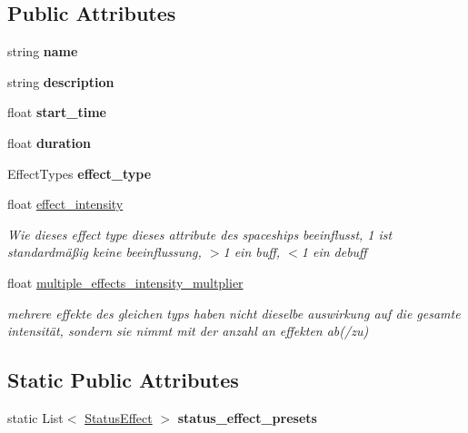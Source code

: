 \subsection*{Public Attributes}
\begin{DoxyCompactItemize}
\item 
\mbox{\label{class_status_effect_a696f2821e6d224c658e8b87d1ce7e796}} 
string {\bfseries name}
\item 
\mbox{\label{class_status_effect_a74029b6847e6b0e538b5e7fc6a762a6c}} 
string {\bfseries description}
\item 
\mbox{\label{class_status_effect_abf37d960e019f77df374e08751044612}} 
float {\bfseries start\+\_\+time}
\item 
\mbox{\label{class_status_effect_a36da090a484cfbcc4ce329f426f5c5a1}} 
float {\bfseries duration}
\item 
\mbox{\label{class_status_effect_a61d875b09e0223962b6ef475f0f540aa}} 
Effect\+Types {\bfseries effect\+\_\+type}
\item 
float \hyperlink{class_status_effect_a8440863026d4e9275ab2c701ddef7938}{effect\+\_\+intensity}
\begin{DoxyCompactList}\small\item\em Wie dieses effect type dieses attribute des spaceships beeinflusst, 1 ist standardmäßig keine beeinflussung, $>$1 ein buff, $<$1 ein debuff \end{DoxyCompactList}\item 
float \hyperlink{class_status_effect_a3504e8fd0ecb620a2678f5cce8660d44}{multiple\+\_\+effects\+\_\+intensity\+\_\+multplier}
\begin{DoxyCompactList}\small\item\em mehrere effekte des gleichen typs haben nicht dieselbe auswirkung auf die gesamte intensität, sondern sie nimmt mit der anzahl an effekten ab(/zu) \end{DoxyCompactList}\end{DoxyCompactItemize}
\subsection*{Static Public Attributes}
\begin{DoxyCompactItemize}
\item 
static List$<$ \hyperlink{class_status_effect}{Status\+Effect} $>$ {\bfseries status\+\_\+effect\+\_\+presets}
\end{DoxyCompactItemize}


